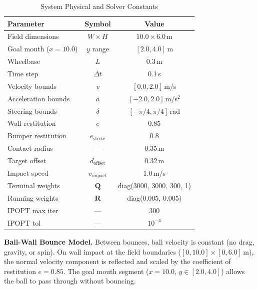 \documentclass[10pt,twocolumn,letterpaper]{article}
\begin{document}
\begin{table}[H]
\centering
\caption{System Physical and Solver Constants}
\label{tab:constraints}
\begin{tabular}{@{}lcc@{}}
\toprule
\textbf{Parameter} & \textbf{Symbol} & \textbf{Value} \\ \midrule
Field dimensions & $W \times H$ & $10.0 \times 6.0$\,m \\
Goal mouth ($x = 10.0$) & $y$ range & $[2.0, 4.0]$\,m \\
Wheelbase & $L$ & 0.3\,m \\
Time step & $\Delta t$ & 0.1\,s \\
Velocity bounds & $v$ & $[0.0, 2.0]$\,m/s \\
Acceleration bounds & $a$ & $[-2.0, 2.0]$\,m/s$^2$ \\
Steering bounds & $\delta$ & $[-\pi/4, \pi/4]$\,rad \\
Wall restitution & $e$ & 0.85 \\
Bumper restitution & $e_{\text{strike}}$ & 0.8 \\
Contact radius & --- & 0.35\,m \\
Target offset & $d_{\text{offset}}$ & 0.32\,m \\
Impact speed & $v_{\text{impact}}$ & 1.0\,m/s \\
Terminal weights & $\mathbf{Q}$ & diag(3000, 3000, 300, 1) \\
Running weights & $\mathbf{R}$ & diag(0.005, 0.005) \\
IPOPT max iter & --- & 300 \\
IPOPT tol & --- & $10^{-4}$ \\
\bottomrule
\end{tabular}
\end{table}

\textbf{Ball-Wall Bounce Model.} Between bounces, ball velocity is
constant (no drag, gravity, or spin). On wall impact at the field
boundaries ($[0, 10.0] \times [0, 6.0]$\,m), the normal velocity
component is reflected and scaled by the coefficient of restitution
$e = 0.85$. The goal mouth segment
($x = 10.0$, $y \in [2.0, 4.0]$) allows the ball to pass through
without bouncing.
\end{document}
